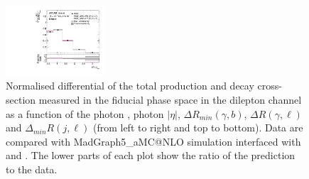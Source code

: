 \begin{figure}[ht]
  \includegraphics[width=0.33\textwidth]{figures/diff_xsec/normalized-unfolded-distributions/tty_total_dilep/DL_tty_total_drlj_unfolded_normalized.pdf}%
  \caption{Normalised differential of the total \tty production and decay
  cross-section measured in the fiducial phase space in the dilepton channel as
  a function of the photon \pt, photon $|\eta|$, $\Delta R_{min} (\gamma, b)$,
  $\Delta R (\gamma, \ell)$ and $\Delta_{min} R (j, \ell)$ (from left to right
  and top to bottom). Data are compared with MadGraph5\_aMC@NLO simulation
  interfaced with \PYTHIA[8] and \HERWIG[7]. The lower parts of each plot show
  the ratio of the prediction to the data.}
  \label{fig:tty_total_diff_DL1_norm}
\end{figure}
\FloatBarrier

